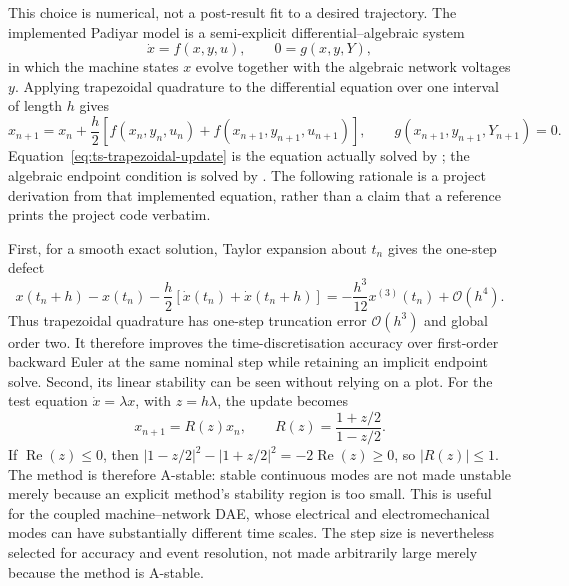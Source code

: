 \documentclass[12pt,a4paper]{article}
\begin{document}
This choice is numerical, not a post-result fit to a desired trajectory.  The
implemented Padiyar model is a semi-explicit differential--algebraic system
\begin{equation}
 \dot{x}=f(x,y,u),\qquad 0=g(x,y,Y),
 \label{eq:ts-dae-interface}
\end{equation}
in which the machine states $x$ evolve together with the algebraic network
voltages $y$.  Applying trapezoidal quadrature to the differential equation
over one interval of length $h$ gives
\begin{equation}
 x_{n+1}=x_n+\frac{h}{2}\left[f(x_n,y_n,u_n)
                  +f(x_{n+1},y_{n+1},u_{n+1})\right],
 \qquad g(x_{n+1},y_{n+1},Y_{n+1})=0.
 \label{eq:ts-trapezoidal-update}
\end{equation}
Equation~\eqref{eq:ts-trapezoidal-update} is the equation actually solved by
; the algebraic endpoint condition is solved by
.  The following rationale is a project
derivation from that implemented equation, rather than a claim that a reference
prints the project code verbatim.

First, for a smooth exact solution, Taylor expansion about $t_n$ gives the
one-step defect
\begin{equation}
x(t_n+h)-x(t_n)-\frac{h}{2}\left[\dot{x}(t_n)+\dot{x}(t_n+h)\right]
=-\frac{h^3}{12}x^{(3)}(t_n)+\mathcal{O}(h^4).
\label{eq:ts-trapezoidal-order}
\end{equation}
Thus trapezoidal quadrature has one-step truncation error
$\mathcal{O}(h^3)$ and global order two.  It therefore
improves the time-discretisation accuracy over first-order backward Euler at
the same nominal step while retaining an implicit endpoint solve.  Second,
its linear stability can be seen without relying on a plot.  For the test
equation $\dot{x}=\lambda x$, with $z=h\lambda$, the update becomes
\begin{equation}
 x_{n+1}=R(z)x_n,\qquad
 R(z)=\frac{1+z/2}{1-z/2}.
 \label{eq:ts-trapezoidal-stability}
\end{equation}
If $\operatorname{Re}(z)\le0$, then
$|1-z/2|^2-|1+z/2|^2=-2\operatorname{Re}(z)\ge0$, so
$|R(z)|\le1$.  The method is therefore A-stable: stable continuous modes are
not made unstable merely because an explicit method's stability region is too
small.  This is useful for the coupled machine--network DAE, whose electrical
and electromechanical modes can have substantially different time scales.
The step size is nevertheless selected for accuracy and event resolution, not
made arbitrarily large merely because the method is A-stable.
\end{document}
